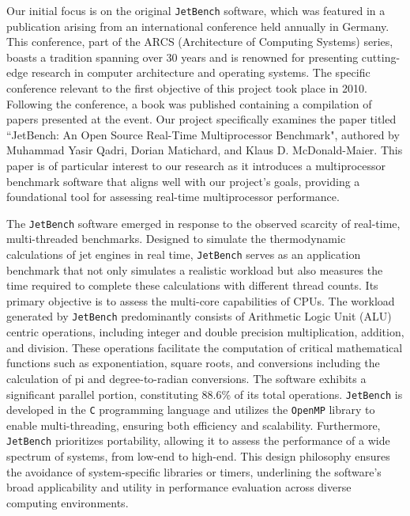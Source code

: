 Our initial focus is on the original \texttt{JetBench} software, which was featured in a publication arising from an international conference held annually in Germany. This conference, part of the ARCS (Architecture of Computing Systems) series, boasts a tradition spanning over 30 years and is renowned for presenting cutting-edge research in computer architecture and operating systems. The specific conference relevant to the first objective of this project took place in 2010. Following the conference, a book was published containing a compilation of papers presented at the event. Our project specifically examines the paper titled ``JetBench: An Open Source Real-Time Multiprocessor Benchmark", authored by Muhammad Yasir Qadri, Dorian Matichard, and Klaus D. McDonald-Maier. This paper is of particular interest to our research as it introduces a multiprocessor benchmark software that aligns well with our project's goals, providing a foundational tool for assessing real-time multiprocessor performance\cite{JetBench_paper}.

The \texttt{JetBench} software emerged in response to the observed scarcity of real-time, multi-threaded benchmarks. Designed to simulate the thermodynamic calculations of jet engines in real time, \texttt{JetBench} serves as an application benchmark that not only simulates a realistic workload but also measures the time required to complete these calculations with different thread counts. Its primary objective is to assess the multi-core capabilities of CPUs. The workload generated by \texttt{JetBench} predominantly consists of Arithmetic Logic Unit (ALU) centric operations, including integer and double precision multiplication, addition, and division. These operations facilitate the computation of critical mathematical functions such as exponentiation, square roots, and conversions including the calculation of pi and degree-to-radian conversions. The software exhibits a significant parallel portion, constituting 88.6\% of its total operations. \texttt{JetBench} is developed in the \texttt{C} programming language and utilizes the \texttt{OpenMP} library to enable multi-threading, ensuring both efficiency and scalability. Furthermore, \texttt{JetBench} prioritizes portability, allowing it to assess the performance of a wide spectrum of systems, from low-end to high-end. This design philosophy ensures the avoidance of system-specific libraries or timers, underlining the software’s broad applicability and utility in performance evaluation across diverse computing environments.

